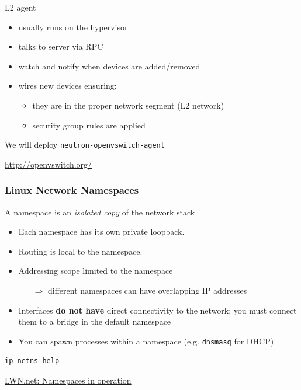 \documentclass[english,serif,mathserif,xcolor=pdftex,dvipsnames,table]{beamer}
\begin{document}
\begin{frame}
  {L2 agent}
  \begin{itemize}
  \item usually runs on the hypervisor
  \item talks to server via RPC
  \item watch and notify when devices are added/removed
  \item wires new devices ensuring:
    \begin{itemize}
    \item they are in the proper network segment (L2 network)
    \item security group rules are applied
    \end{itemize}
  \end{itemize}

  \+
  We will deploy \texttt{neutron-openvswitch-agent}

  \+
  {\footnotesize\url{http://openvswitch.org/}}
\end{frame}



\begin{frame}[fragile]
  \frametitle{Linux Network Namespaces}
A namespace is an \textit{isolated copy} of the network stack

\begin{itemize}
\item Each namespace has its own private loopback.
\item Routing is local to the namespace.
\item Addressing scope limited to the namespace
  \begin{itemize}
  \item[$\Rightarrow$] different namespaces can have overlapping IP addresses
  \end{itemize}
\item Interfaces \textbf{do not have} direct connectivity to the
  network: you must connect them to a bridge in the default namespace
\item You can spawn processes within a namespace
  (e.g. \texttt{dnsmasq} for DHCP)
\end{itemize}

\footnotesize
\begin{verbatim}
ip netns help
\end{verbatim}
{\footnotesize\href{http://lwn.net/Articles/531114/}{LWN.net: Namespaces
    in operation}}
\end{frame}
\end{document}
